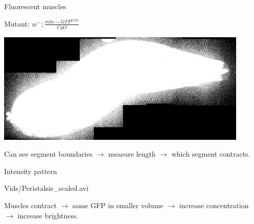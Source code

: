 \documentclass{beamer}%
\newcommand{\citerr}[1]{\hfill {\footnotesize{\color{darkgrey}\cite{#1}}}}
\begin{document}
\begin{frame}{Fluorescent muscles}
%
 \begin{center}
 Mutant: $w^-; \frac{mhc-GFP^{0110}}{CyO}$ \citerr{Hughes17498969}

 \includegraphics[width=12cm]{Figs/LarvaStitchScaled.png}
 \end{center}

 \vp Can see segment boundaries $\to$ measure length $\to$ which segment contracts.
%
\end{frame}


\begin{frame}{Intensity pattern}
%
 \begin{center}
 {Vids/Peristalsis_scaled.avi}
 \end{center}

 Muscles contract $\rightarrow$ same GFP in smaller volume $\rightarrow$ increase
 concentration $\rightarrow$ increase brightness.

%
\end{frame}
\end{document}
